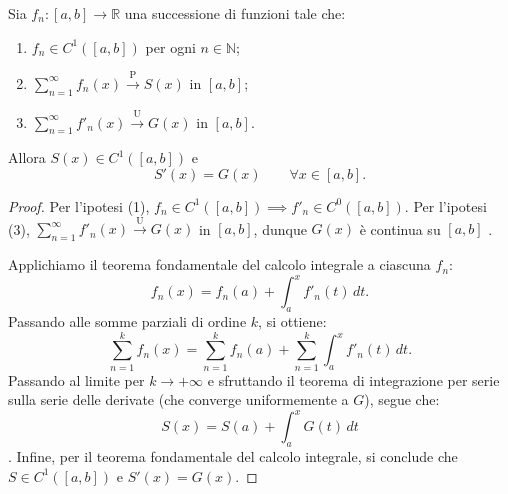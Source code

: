 \begin{theorem}
Sia $f_n : [a, b] \to \mathbb{R}$ una successione di funzioni tale che:
\begin{enumerate}
    \item $f_n \in C^1([a, b])$ per ogni $n \in \mathbb{N}$;
    \item $\sum_{n=1}^{\infty} f_n(x) \xrightarrow{\text{P}} S(x)$ in $[a, b]$;
    \item $\sum_{n=1}^{\infty} f'_n(x) \xrightarrow{\text{U}} G(x)$ in $[a, b]$.
\end{enumerate}
Allora $S(x) \in C^1([a, b])$ e
\[
S'(x) = G(x) \qquad \forall x \in [a, b].
\]
\end{theorem}

\begin{proof}
Per l'ipotesi (1), $f_n \in C^1([a, b]) \implies f'_n \in C^0([a, b])$. Per l'ipotesi (3), $\sum_{n=1}^{\infty} f'_n(x) \xrightarrow{\text{U}} G(x)$ in $[a, b]$, dunque $G(x)$ è continua su $[a, b]$ .

Applichiamo il teorema fondamentale del calcolo integrale a ciascuna $f_n$:
\[
f_n(x) = f_n(a) + \int_a^x f'_n(t) \, dt.
\]
Passando alle somme parziali di ordine $k$, si ottiene:
\[
\sum_{n=1}^{k} f_n(x) = \sum_{n=1}^{k} f_n(a) + \sum_{n=1}^{k} \int_a^x f'_n(t) \, dt.
\]
Passando al limite per $k \to +\infty$ e sfruttando il teorema di integrazione per serie sulla serie delle derivate (che converge uniformemente a $G$), segue che:
\[
S(x) = S(a) + \int_a^x G(t) \, dt
\]
. Infine, per il teorema fondamentale del calcolo integrale, si conclude che $S \in C^1([a, b])$ e $S'(x) = G(x)$.
\end{proof}
